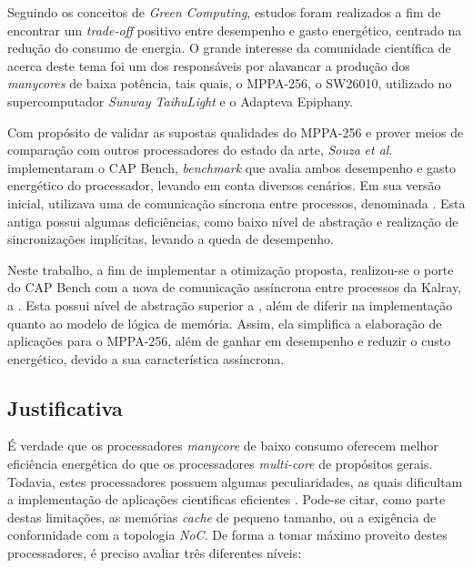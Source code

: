 \documentclass[a4paper,11pt]{article}
\newcommand{\etal}{\textit{et al}.\xspace}
\newcommand{\mppa}{MPPA-256\xspace}
\newcommand{\capb}{CAP Bench\xspace}
\newcommand{\epiphany}{Adapteva Epiphany\xspace}
\newcommand{\manycore}{\textit{manycore}\xspace}
\newcommand{\manycores}{\textit{manycores}\xspace}
\begin{document}
Seguindo os conceitos de \textit{Green Computing}, estudos foram realizados a fim de encontrar um \textit{trade-off} positivo entre desempenho e gasto energético, centrado na redução do consumo de energia. O grande interesse da comunidade científica de \hpc acerca deste tema foi um dos responsáveis por alavancar a produção dos \manycores de baixa potência, tais quais, o \mppa \cite{MPPA-2:2013}, o SW26010, utilizado no supercomputador \textit{Sunway TaihuLight} \cite{sunway:2016} e o \epiphany  \cite{Olofsson2014}.

Com propósito de validar as supostas qualidades do \mppa e prover meios de comparação com outros processadores do estado da arte, \textit{Souza} \etal implementaram o \capb \cite{Castro-Souza-CCPE:2016}, \textit{benchmark} que avalia ambos desempenho e gasto energético do processador, levando em conta diversos cenários. Em sua versão inicial, utilizava uma \api de comunicação síncrona entre processos, denominada \ipc \cite{MPPA-2:2013}. Esta antiga \api possui algumas deficiências, como baixo nível de abstração e realização de sincronizações implícitas, levando a queda de desempenho.

Neste trabalho, a fim de implementar a otimização proposta, realizou-se o porte do \capb com a nova \api de comunicação assíncrona entre processos da Kalray, a \async \cite{Hascoet2017}. Esta \api possui nível de abstração superior a \ipc, além de diferir na implementação quanto ao modelo de lógica de memória. Assim, ela simplifica a elaboração de aplicações para o \mppa, além de ganhar em desempenho e reduzir o custo energético, devido a sua característica assíncrona.

\subsection{Justificativa}

É verdade que os processadores \manycore de baixo consumo oferecem melhor eficiência energética do que os processadores \textit{multi-core} de propósitos gerais. Todavia, estes processadores possuem algumas peculiaridades, as quais dificultam a implementação de aplicações cientificas eficientes \cite{Castro:2013:ACE:2535753.2535757}. Pode-se citar, como parte destas limitações, as memórias \textit{cache} de pequeno tamanho, ou a exigência de conformidade com a topologia \textit{NoC}. De forma a tomar máximo proveito destes processadores, é preciso avaliar três diferentes níveis: 
\end{document}
